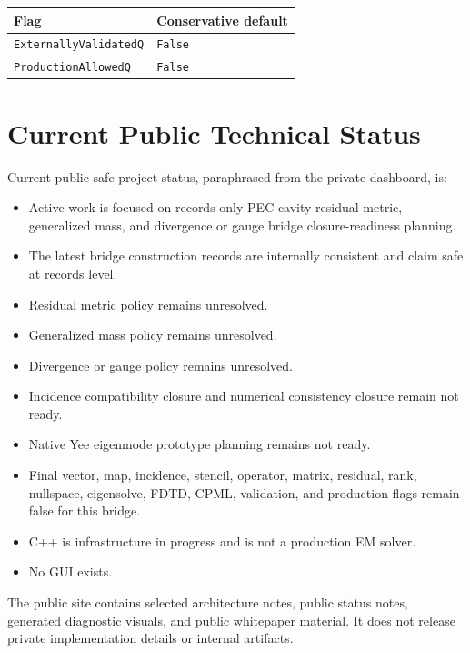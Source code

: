 \documentclass[11pt,a4paper]{article}
\newcommand{\code}[1]{\texttt{#1}}
\begin{document}
\begin{center}
\begin{tabular}{ll}
\toprule
\textbf{Flag} & \textbf{Conservative default}\\
\midrule
\code{ExternallyValidatedQ} & \code{False}\\
\code{ProductionAllowedQ} & \code{False}\\
\bottomrule
\end{tabular}
\end{center}

\section{Current Public Technical Status}
\label{sec:current-public-technical-status}

Current public-safe project status, paraphrased from the private dashboard, is:

\begin{itemize}
  \item Active work is focused on records-only PEC cavity residual metric, generalized mass, and divergence or gauge bridge closure-readiness planning.
  \item The latest bridge construction records are internally consistent and claim safe at records level.
  \item Residual metric policy remains unresolved.
  \item Generalized mass policy remains unresolved.
  \item Divergence or gauge policy remains unresolved.
  \item Incidence compatibility closure and numerical consistency closure remain not ready.
  \item Native Yee eigenmode prototype planning remains not ready.
  \item Final vector, map, incidence, stencil, operator, matrix, residual, rank, nullspace, eigensolve, FDTD, CPML, validation, and production flags remain false for this bridge.
  \item C++ is infrastructure in progress and is not a production EM solver.
  \item No GUI exists.
\end{itemize}

The public site contains selected architecture notes, public status notes, generated diagnostic visuals, and public whitepaper material. It does not release private implementation details or internal artifacts.
\end{document}

